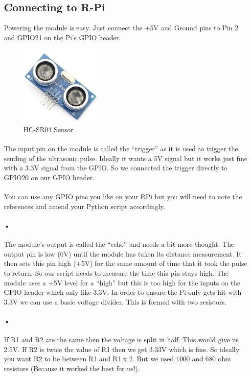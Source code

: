 \documentclass[11pt,a4paper]{article}
\begin{document}
		\subsection{Connecting to R-Pi}
			Powering the module is easy. Just connect the +5V and Ground pins to Pin 2 and GPIO21 on the Pi’s GPIO header.
			\begin{figure}[h]
				\centering
				\includegraphics[scale=0.75]{sensor}
				\caption{HC-SR04 Sensor}
			\end{figure}

\paragraph{}The input pin on the module is called the “trigger” as it is used to trigger the sending of the ultrasonic pulse. Ideally it wants a 5V signal but it works just fine with a 3.3V signal from the GPIO. So we connected the trigger directly to GPIO20 on our GPIO header.
\paragraph{}
You can use any GPIO pins you like on your RPi but you will need to note the references and amend your Python script accordingly.
\paragraph{•}
The module’s output is called the “echo” and needs a bit more thought. The output pin is low (0V) until the module has taken its distance measurement. It then sets this pin high (+5V) for the same amount of time that it took the pulse to return. So our script needs to measure the time this pin stays high. The module uses a +5V level for a “high” but this is too high for the inputs on the GPIO header which only like 3.3V. In order to ensure the Pi only gets hit with 3.3V we can use a basic voltage divider. This is formed with two resistors.
\paragraph{•}
If R1 and R2 are the same then the voltage is split in half. This would give us 2.5V. If R2 is twice the value of R1 then we get 3.33V which is fine. So ideally you want R2 to be between R1 and R1 x 2. But we used 1000 and 680 ohm resistors (Because it worked the best for us!).
\end{document}
